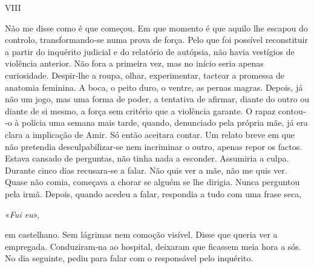 VIII

Não me disse como é que começou. Em que momento é que aquilo lhe escapou
do controlo, transformando­‑se numa prova de força. Pelo que foi
possível reconstituir a partir do inquérito judicial e do relatório de
autópsia, não havia vestígios de violência anterior. Não fora a primeira
vez, mas no início seria apenas curiosidade. Despir­‑lhe a roupa, olhar,
experimentar, tactear a promessa de anatomia feminina. A boca, o peito
duro, o ventre, as pernas magras. Depois, já não um jogo, mas uma forma
de poder, a tentativa de afirmar, diante do outro ou diante de si mesmo,
a força sem critério que a violência garante. O rapaz contou­‑o à
polícia uma semana mais tarde, quando, denunciado pela própria mãe, já
era clara a implicação de Amir. Só então aceitara contar. Um relato
breve em que não pretendia desculpabilizar­‑se nem incriminar o outro,
apenas repor os factos. Estava cansado de perguntas, não tinha nada a
esconder. Assumiria a culpa. Durante cinco dias recusara­‑se a falar.
Não quis ver a mãe, não me quis ver. Quase não comia, começava a chorar
se alguém se lhe dirigia. Nunca perguntou pela irmã. Depois, quando
acedeu a falar, respondia a tudo com uma frase seca,

«\emph{Fui eu}»,

em castelhano. Sem lágrimas nem comoção visível. Disse que queria ver a
empregada. Conduziram­‑na ao hospital, deixaram que ficassem meia hora a
sós. No dia seguinte, pediu para falar com o responsável pelo inquérito.

